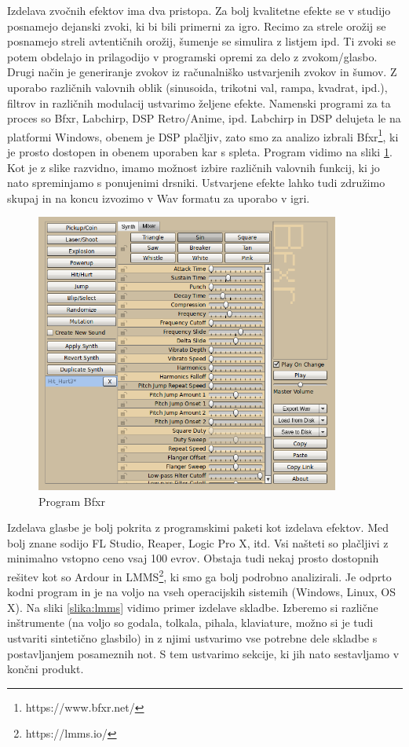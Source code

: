 \documentclass[12pt,a4paper,twoside]{book}
\begin{document}
Izdelava zvočnih efektov ima dva pristopa. Za bolj kvalitetne efekte se v studijo posnamejo dejanski zvoki, ki bi bili primerni za igro. Recimo za strele orožij se posnamejo streli avtentičnih orožij, šumenje se simulira z listjem ipd. Ti zvoki se potem obdelajo in prilagodijo v programski opremi za delo z zvokom/glasbo. Drugi način je generiranje zvokov iz računalniško ustvarjenih zvokov in šumov. Z uporabo različnih valovnih oblik (sinusoida, trikotni val, rampa, kvadrat, ipd.), filtrov in različnih modulacij ustvarimo željene efekte. Namenski programi za ta proces so Bfxr, Labchirp, DSP Retro/Anime, ipd. Labchirp in DSP delujeta le na platformi Windows, obenem je DSP plačljiv, zato smo za analizo izbrali Bfxr\footnote{https://www.bfxr.net/}, ki je prosto dostopen in obenem uporaben kar s spleta. Program vidimo na sliki \ref{slika:bfxr}. Kot je z slike razvidno, imamo možnost izbire različnih valovnih funkcij, ki jo nato spreminjamo s ponujenimi drsniki. Ustvarjene efekte lahko tudi združimo skupaj in na koncu izvozimo v Wav formatu za uporabo v igri.

\begin{figure}[h]
	\centering
	\includegraphics[width=10cm]{bfxr}
	\caption{Program Bfxr}
	\label{slika:bfxr}
\end{figure}

Izdelava glasbe je bolj pokrita z programskimi paketi kot izdelava efektov. Med bolj znane sodijo FL Studio, Reaper, Logic Pro X, itd. Vsi našteti so plačljivi z minimalno vstopno ceno vsaj 100 evrov. Obstaja tudi nekaj prosto dostopnih rešitev kot so Ardour in LMMS\footnote{https://lmms.io/}, ki smo ga bolj podrobno analizirali. Je odprto kodni program in je na voljo na vseh operacijskih sistemih (Windows, Linux, OS X). Na sliki \ref{slika:lmms} vidimo primer izdelave skladbe. Izberemo si različne inštrumente (na voljo so godala, tolkala, pihala, klaviature, možno si je tudi ustvariti sintetično glasbilo) in z njimi ustvarimo vse potrebne dele skladbe s postavljanjem posameznih not. S tem ustvarimo sekcije, ki jih nato sestavljamo v končni produkt.
\end{document}

